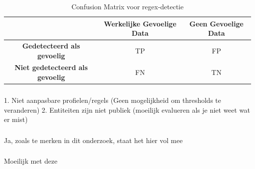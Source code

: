 \begin{table}[h]
    \centering
    \begin{tabular}{|c|c|c|}
        \hline
        \textbf{} & \textbf{Werkelijke Gevoelige Data} & \textbf{Geen Gevoelige Data} \\ \hline
        \textbf{Gedetecteerd als gevoelig} & TP & FP \\ \hline
        \textbf{Niet gedetecteerd als gevoelig} & FN & TN \\ \hline
    \end{tabular}
    \caption{Confusion Matrix voor regex-detectie}
    \label{tab:confusion_matrix-vooraf}
\end{table}


\subsubsection{}
\label{}


1. Niet aanpasbare profielen/regels (Geen mogelijkheid om thresholds te veranderen)
2. Entiteiten zijn niet publiek (moeilijk evalueren als je niet weet wat er mist)

\subsubsection{}
\label{}

Ja, zoals te merken in dit onderzoek, staat het hier vol mee

\subsubsection{}
\label{}

Moeilijk met deze

\subsubsection{}
\label{}

